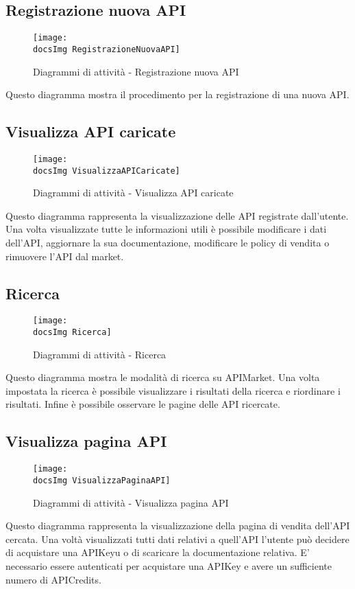 {	\subsection{Registrazione nuova API}{
		\begin{figure}[H]
			\centering
			\texttt{[image: \\docsImg RegistrazioneNuovaAPI]}
			\caption{Diagrammi di attività - Registrazione nuova API}
		\end{figure}
			Questo diagramma mostra il procedimento per la registrazione di una nuova API. 
	}
	\subsection{Visualizza API caricate}{
		\begin{figure}[H]
			\centering
			\texttt{[image: \\docsImg VisualizzaAPICaricate]}
			\caption{Diagrammi di attività - Visualizza API caricate}
		\end{figure}
			Questo diagramma rappresenta la visualizzazione delle API registrate dall'utente. Una volta visualizzate tutte le informazioni utili è possibile modificare i dati dell'API, aggiornare la sua documentazione, modificare le policy di vendita o rimuovere l'API dal market. 

	}
	\subsection{Ricerca}{
		\begin{figure}[H]
			\centering
			\texttt{[image: \\docsImg Ricerca]}
			\caption{Diagrammi di attività - Ricerca}
		\end{figure}
			Questo diagramma mostra le modalità di ricerca su APIMarket. Una volta impostata la ricerca è possibile visualizzare i risultati della ricerca e riordinare i risultati. Infine è possibile osservare le pagine delle API ricercate. 	
	}
	\subsection{Visualizza pagina API}{
		\begin{figure}[H]
			\centering
			\texttt{[image: \\docsImg VisualizzaPaginaAPI]}
			\caption{Diagrammi di attività - Visualizza pagina API}
		\end{figure}
			Questo diagramma rappresenta la visualizzazione della pagina di vendita dell'API cercata. Una voltà visualizzati tutti dati relativi a quell'API l'utente può decidere di acquistare una APIKeyu o di scaricare la documentazione relativa. E' necessario essere autenticati per acquistare una APIKey e avere un sufficiente numero di APICredits.  
	}
}
